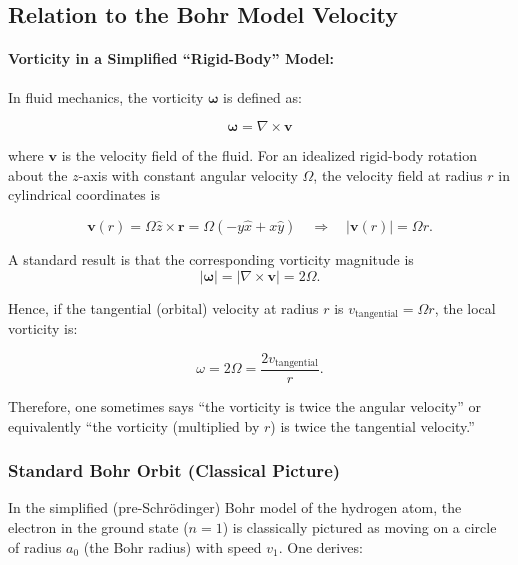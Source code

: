 \subsection{Relation to the Bohr Model Velocity}\label{subsec:Relation-to-the-Bohr-Model-Velocity}
\paragraph{Vorticity in a Simplified ``Rigid-Body'' Model:}

In fluid mechanics, the vorticity $\boldsymbol{\omega}$ is defined as:

\begin{equation}
    \boldsymbol{\omega} = \nabla \times \mathbf{v}\label{eq:vorticity}
\end{equation}

where $\mathbf{v}$ is the velocity field of the fluid.
For an idealized rigid-body rotation about the $z$-axis with constant angular velocity $\Omega$, the velocity field at radius $r$ in cylindrical coordinates is

\begin{equation}
    \mathbf{v}(r) = \Omega \hat{z} \times \mathbf{r} = \Omega(-y\hat{x} + x\hat{y}) \quad \Rightarrow \quad |
    \mathbf{v}(r)| = \Omega r.\label{eq:cylindrical-velocity}
\end{equation}

A standard result is that the corresponding vorticity magnitude is
\begin{equation}
    |\boldsymbol{\omega}| = \left| \nabla \times \mathbf{v} \right| = 2\Omega.\label{eq:vortcity-magnitude}
\end{equation}

Hence, if the tangential (orbital) velocity at radius $r$ is $v_\text{tangential} = \Omega r$, the local vorticity is:

\begin{equation}
    \omega = 2\Omega = \frac{2v_\text{tangential}}{r}.\label{eq:2velocity}
\end{equation}

Therefore, one sometimes says ``the vorticity is twice the angular velocity'' or equivalently ``the vorticity (multiplied by $r$) is twice the tangential velocity.''

\subsubsection*{Standard Bohr Orbit (Classical Picture)}
In the simplified (pre-Schr\"odinger) Bohr model of the hydrogen atom, the electron in the ground state ($n=1$) is classically pictured as moving on a circle of radius $a_0$ (the Bohr radius) with speed $v_1$.
One derives:

